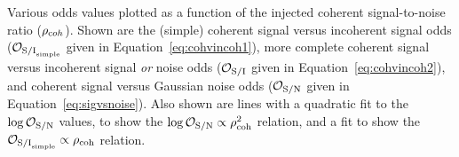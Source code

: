 \label{fig:snrvsodds}
Various odds values plotted as a function of the injected coherent signal-to-noise ratio ($\rho_{\text coh}$).
Shown are the (simple) coherent signal versus incoherent signal odds ($\mathcal{O}_{{\rm S/I}_{\rm simple}}$ given
in Equation~\ref{eq:cohvincoh1}), more complete coherent signal versus incoherent signal {\it or} noise odds
($\mathcal{O}_{\rm S/I}$ given in Equation~\ref{eq:cohvincoh2}), and coherent signal versus Gaussian noise odds
($\mathcal{O}_{\rm S/N}$ given in Equation~\ref{eq:sigvsnoise}). Also shown are lines with a quadratic fit
to the $\log{\mathcal{O}_{\rm S/N}}$ values, to show the $\log{\mathcal{O}_{\rm S/N}} \propto \rho_{\text{coh}}^2$ relation,
and a fit to show the $\mathcal{O}_{{\rm S/I}_{\rm simple}} \propto \rho_{\text{coh}}$ relation.
  
